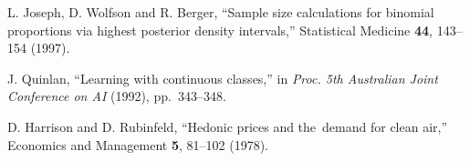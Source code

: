 \documentclass[
11pt,%
tightenlines,%
twoside,%
onecolumn,%
nofloats,%
nobibnotes,%
nofootinbib,%
superscriptaddress,%
noshowpacs,%
centertags]%
{revtex4}
\begin{document}
\begin{thebibliography}{}
	L. Joseph, D. Wolfson and R. Berger, ``Sample size calculations for binomial proportions via highest posterior density intervals,'' Statistical Medicine \textbf{44}, 143--154 (1997).
	
	J. Quinlan, ``Learning with continuous classes,'' in \emph{Proc. 5th Australian Joint Conference on AI} (1992), pp.~343--348.
	
	D. Harrison and D. Rubinfeld, ``Hedonic prices and the~demand for clean air,'' Economics and Management \textbf{5}, 81--102 (1978).

\end{thebibliography}
\end{document}
